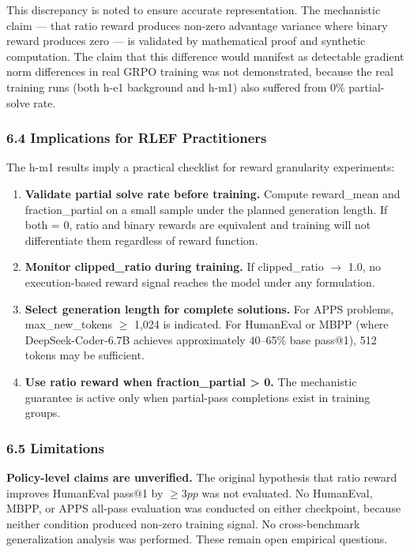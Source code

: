 This discrepancy is noted to ensure accurate representation. The mechanistic claim --- that ratio reward produces non-zero advantage variance where binary reward produces zero --- is validated by mathematical proof and synthetic computation. The claim that this difference would manifest as detectable gradient norm differences in real GRPO training was not demonstrated, because the real training runs (both h-e1 background and h-m1) also suffered from 0\% partial-solve rate.

\subsubsection{6.4 Implications for RLEF Practitioners}

The h-m1 results imply a practical checklist for reward granularity experiments:

\begin{enumerate}
\item \textbf{Validate partial solve rate before training.} Compute reward\_mean and fraction\_partial on a small sample under the planned generation length. If both = 0, ratio and binary rewards are equivalent and training will not differentiate them regardless of reward function.
\item \textbf{Monitor clipped\_ratio during training.} If clipped\_ratio $\rightarrow$ 1.0, no execution-based reward signal reaches the model under any formulation.
\item \textbf{Select generation length for complete solutions.} For APPS problems, max\_new\_tokens $\geq$ 1,024 is indicated. For HumanEval or MBPP (where DeepSeek-Coder-6.7B achieves approximately 40--65\% base pass@1), 512 tokens may be sufficient.
\item \textbf{Use ratio reward when fraction\_partial > 0.} The mechanistic guarantee is active only when partial-pass completions exist in training groups.
\end{enumerate}

\subsubsection{6.5 Limitations}

\textbf{Policy-level claims are unverified.} The original hypothesis that ratio reward improves HumanEval pass@1 by $\geq 3pp$ was not evaluated. No HumanEval, MBPP, or APPS all-pass evaluation was conducted on either checkpoint, because neither condition produced non-zero training signal. No cross-benchmark generalization analysis was performed. These remain open empirical questions.

